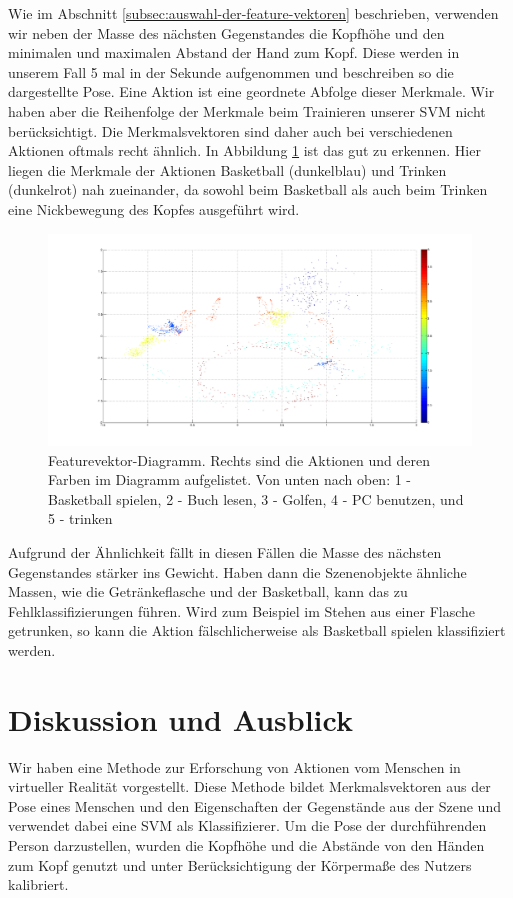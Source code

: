 Wie im Abschnitt \ref{subsec:auswahl-der-feature-vektoren} beschrieben, verwenden wir neben der Masse des nächsten Gegenstandes die Kopfhöhe und den minimalen und maximalen Abstand der Hand zum Kopf. Diese werden in unserem Fall 5 mal in der Sekunde aufgenommen und beschreiben so die dargestellte Pose. Eine Aktion ist eine geordnete Abfolge dieser Merkmale. Wir haben aber die Reihenfolge der Merkmale beim Trainieren unserer SVM nicht berücksichtigt. Die Merkmalsvektoren sind daher auch bei verschiedenen Aktionen oftmals recht ähnlich. In Abbildung \ref{fig:Merkmalvektoren-Diagramm} ist das gut zu erkennen. Hier liegen die Merkmale der Aktionen Basketball (dunkelblau) und Trinken (dunkelrot) nah zueinander, da sowohl beim Basketball als auch beim Trinken eine Nickbewegung des Kopfes ausgeführt wird.\newline
\begin{figure}[hbtp]
\includegraphics[width=1.0\linewidth]{altefeatures4.png}
\caption{Featurevektor-Diagramm. Rechts sind die Aktionen und deren Farben im Diagramm aufgelistet. Von unten nach oben: 1 - Basketball spielen, 2 - Buch lesen, 3 - Golfen, 4 - PC benutzen, und 5 - trinken }
\label{fig:Merkmalvektoren-Diagramm}
\end{figure}
Aufgrund der Ähnlichkeit fällt in diesen Fällen die Masse des nächsten Gegenstandes stärker ins Gewicht. Haben dann die Szenenobjekte ähnliche Massen, wie die Getränkeflasche und der Basketball, kann das zu Fehlklassifizierungen führen. Wird zum Beispiel im Stehen aus einer Flasche getrunken, so kann die Aktion fälschlicherweise als \glqq{}Basketball spielen\grqq{} klassifiziert werden. 

\section{Diskussion und Ausblick}
\label{diskussion-ausblick}
Wir haben eine Methode zur Erforschung von Aktionen vom Menschen in virtueller Realität vorgestellt. Diese Methode bildet Merkmalsvektoren aus der Pose eines Menschen und den Eigenschaften der Gegenstände aus der Szene und verwendet dabei eine SVM als Klassifizierer. Um die Pose der durchführenden Person darzustellen, wurden die Kopfhöhe und die Abstände von den Händen zum Kopf genutzt und unter Berücksichtigung der Körpermaße des Nutzers kalibriert. 


